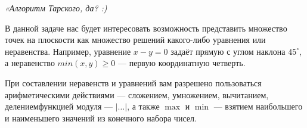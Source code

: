 ﻿

\begin{flushright} \itshape
	«Алгоритм Тарского, да? :)
\end{flushright}

\ms В данной задаче нас будет интересовать возможность представить множество точек на плоскости как множество решений какого-либо уравнения или неравенства. Например, уравнение $x - y = 0$ задаёт прямую с углом наклона $45^\circ$, а неравенство $min (x,y) \geq 0$ — первую координатную четверть.

\ms При составлении неравенств и уравнений вам разрешено пользоваться арифметическими действиями — сложением, умножением, вычитанием, делением\scolon функцией модуля — $|\ldots|$, а также $\max$ и $\min$ — взятием наибольшего и наименьшего значений из конечного набора чисел.

